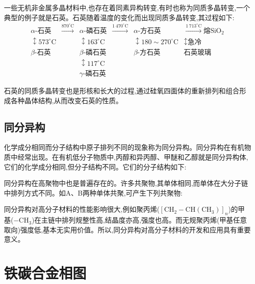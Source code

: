 \documentclass[UTF8]{ctexbook}
\newcommand{\◎}{\ensuremath{\bigcirc}}
\begin{document}
一些无机非金属多晶材料中,也存在着同素异构转变,有时也称为同质多晶转变,一个典型的例子就是石英。石英随着温度的变化而出现同质多晶转变,其过程如下:
\[
\begin{array}{cccccc}
\alpha\text{-石英} & \xrightarrow{870^{\circ}\text{C}} & \alpha\text{-磷石英} & \xrightarrow{1\ 470^{\circ}\text{C}} & \alpha\text{-方石英} & \xrightarrow{1\ 713^{\circ}\text{C}} \text{熔}\text{SiO}_2 \\
\updownarrow 573^{\circ}\text{C} & & \updownarrow 163^{\circ}\text{C} & & \updownarrow 180 \sim 270^{\circ}\text{C} & \updownarrow \text{急冷} \\
\beta\text{-石英} & & \beta\text{-磷石英} & & \beta\text{-方石英} & \text{石英玻璃} \\
& & \updownarrow 117^{\circ}\text{C} & & & \\
& & \gamma\text{-磷石英} & & &
\end{array}
\]

石英的同质多晶转变也是形核和长大的过程,通过硅氧四面体的重新排列和组合形成各种晶体结构,从而改变石英的性质。

\subsection{同分异构}
化学成分相同而分子结构中原子排列不同的现象称为同分异构。同分异构在有机物质中经常出现。在有机低分子物质中,丙醇和异丙醇、甲醚和乙醇就是同分异构体,它们的化学成分相同,但分子结构不同。它们的分子结构如下:

\begin{figure}[H]
    \centering
\end{figure}

同分异构在高聚物中也是普遍存在的。许多共聚物,其单体相同,而单体在大分子链中排列方式不同。如A、B两种单体共聚,可产生下列共聚物:

\begin{figure}[H]
	\centering
\end{figure}

同分异构对高分子材料的性能影响很大,例如聚丙烯($[\text{CH}_2-\text{CH}(\text{CH}_3)]_n$)的甲基($-\text{CH}_3$)在主链中排列规整性高,结晶度亦高,强度也高。而无规聚丙烯(甲基任意取向)强度低,基本无实用价值。所以,同分异构对高分子材料的开发和应用具有重要意义。

\section{铁碳合金相图}
\end{document}

